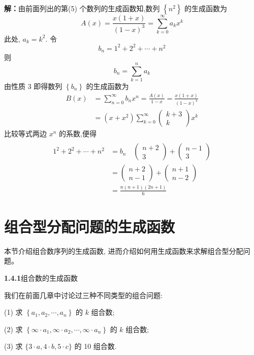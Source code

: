 \documentclass{report}
\begin{document}
\textbf{解：}由前面列出的第(5) 个数列的生成函数知,数列 $\left\{n^{2}\right\}$ 的生成函数为
$$
A(x)=\frac{x(1+x)}{(1-x)^{3}}=\sum_{k=0}^{\infty} a_{k} x^{k}
$$
此处, $a_{k}=k^{2}$. 令
$$
b_{n}=1^{2}+2^{2}+\cdots+n^{2}
$$
则
$$
b_{n}=\sum_{k=1}^{n} a_{k}
$$
由性质 3 即得数列 $\left\{b_{n}\right\}$ 的生成函数为
$$
\begin{aligned}
B(x) &=\sum_{n=0}^{\infty} b_{n} x^{n}=\frac{A(x)}{1-x}=\frac{x(1+x)}{(1-x)^{4}} \\
&=\left(x+x^{2}\right) \sum_{k=0}^{\infty}\left(\begin{array}{c}
k+3 \\ k
\end{array}\right) x^{k}
\end{aligned}
$$
比较等式两边 $x^{n}$ 的系数,便得
$$
\begin{aligned}
\\
1^{2}+2^{2}+\cdots+n^{2} &=b_{n} \quad\left(\begin{array}{c}
n+2 \\ 3
\end{array}\right)+\left(\begin{array}{c}
n-1 \\ 3
\end{array}\right) \\
&=\left(\begin{array}{l}
n+2 \\ n-1
\end{array}\right)+\left(\begin{array}{l}
n+1 \\ n-2
\end{array}\right) \\
&=\frac{n(n+1)(2 n+1)}{6}
\end{aligned}
$$

\section{组合型分配问题的生成函数}
本节介绍组合数序列的生成函数, 进而介绍如何用生成函数来求解组合型分配问题。

\textbf{1.4.1}组合数的生成函数

我们在前面几章中讨论过三种不同类型的组合问题:


(1) 求 $\left\{a_{1}, a_{2}, \cdots, a_{n}\right\}$ 的 $k$ 组合数;

(2) 求 $\left\{\infty \cdot a_{1}, \infty \cdot a_{2}, \cdots, \infty \cdot a_{n}\right\}$ 的 $k$ 组合数;

(3) 求 $\{3 \cdot a, 4 \cdot b, 5 \cdot c\}$ 的 10 组合数.
\end{document}
